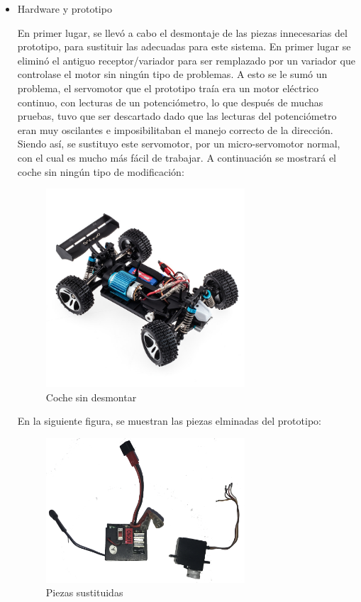 \documentclass{pclass}
\begin{document}
\begin{itemize}

\item Hardware y prototipo

En primer lugar, se llevó a cabo el desmontaje de las piezas innecesarias del prototipo, para sustituir las adecuadas para este sistema. En primer lugar se eliminó el antiguo receptor/variador para ser remplazado por un variador que controlase el motor sin ningún tipo de problemas. A esto se le sumó un problema, el servomotor que el prototipo traía era un motor eléctrico continuo, con lecturas de un potenciómetro, lo que después de muchas pruebas, tuvo que ser descartado dado que las lecturas del potenciómetro eran muy oscilantes e imposibilitaban el manejo correcto de la dirección. Siendo así, se sustituyo este servomotor, por un micro-servomotor normal, con el cual es mucho más fácil de trabajar.
A continuación se mostrará el coche sin ningún tipo de modificación:

\begin{figure}[H]
  \centering
    \includegraphics[width=0.7\textwidth]{img/A959}
  \caption{Coche sin desmontar}
  \label{fig:CocheSin}
\end{figure}

En la siguiente figura, se muestran las piezas elminadas del prototipo:

\begin{figure}[H]
  \centering
    \includegraphics[width=0.7\textwidth]{img/piezasSustituidas}
  \caption{Piezas sustituidas}
  \label{fig:PiezasSusti}
\end{figure}


\end{itemize}
\end{document}
